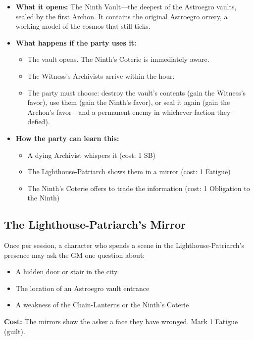 \begin{itemize}
\item \textbf{What it opens:} The Ninth Vault---the deepest of the Astroegro vaults, sealed by the first Archon. It contains the original Astroegro orrery, a working model of the cosmos that still ticks.

\item \textbf{What happens if the party uses it:}
  \begin{itemize}
    \item The vault opens. The Ninth's Coterie is immediately aware.
    \item The Witness's Archivists arrive within the hour.
    \item The party must choose: destroy the vault's contents (gain the Witness's favor), use them (gain the Ninth's favor), or seal it again (gain the Archon's favor---and a permanent enemy in whichever faction they defied).
  \end{itemize}

\item \textbf{How the party can learn this:}
  \begin{itemize}
    \item A dying Archivist whispers it (cost: 1 SB)
    \item The Lighthouse-Patriarch shows them in a mirror (cost: 1 Fatigue)
    \item The Ninth's Coterie offers to trade the information (cost: 1 Obligation to the Ninth)
  \end{itemize}
\end{itemize}

\subsection*{The Lighthouse-Patriarch's Mirror}
\label{sec:thepyrgos-patriarch}

Once per session, a character who spends a scene in the Lighthouse-Patriarch's presence may ask the GM one question about:
\begin{itemize}
\item A hidden door or stair in the city
\item The location of an Astroegro vault entrance
\item A weakness of the Chain-Lanterns or the Ninth's Coterie
\end{itemize}

\textbf{Cost:} The mirrors show the asker a face they have wronged. Mark 1 Fatigue (guilt).

